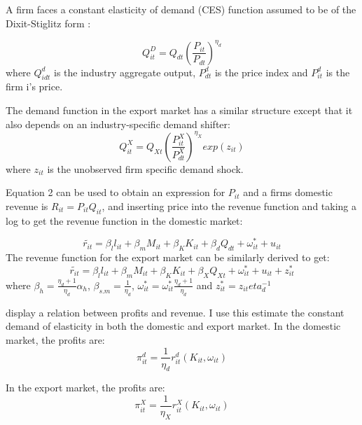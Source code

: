 \documentclass[11pt]{article}
\begin{document}
A firm faces a constant elasticity of demand (CES) function assumed to
be of the Dixit-Stiglitz form :

\begin{equation}
Q_{it}^{D} = Q_{dt}(\frac{P_{it}}{P_{dt}})^{\eta_{d}}
\end{equation} 
where $Q_{idt}^{d}$ is the industry aggregate output, $P_{dt}^{d}$ is
the price index and $P_{it}^{d}$ is the firm i's price. 

The demand function in the export market has a similar structure
except that it also depends on an industry-specific demand shifter: 
\begin{equation}
Q_{it}^{X} = Q_{Xt}(\frac{P_{it}^{X}}{P_{dt}^{X}})^{\eta_{X}}exp(z_{it})
\end{equation} 
where $z_{it}$ is the unobserved firm specific demand
shock. 

Equation 2 can be used to obtain an expression for $P_{it}$ and a
firms domestic revenue is $R_{it} = P_{it}Q_{it}$, and inserting price
into the revenue function and taking a log to get the revenue function
in the domestic market:

\begin{equation}
\tilde{r_{it}} = \beta_{l}l_{it} + \beta_{m}M_{it} + \beta_{K}K_{it} +
\beta_{d}Q_{dt} + \omega^{*}_{it} + u_{it}
\end{equation}
 The revenue function for the export market can be similarly derived
 to get:
\begin{equation}
\tilde{r_{it}} = \beta_{l}l_{it} + \beta_{m}M_{it} + \beta_{K}K_{it} +
\beta_{X}Q_{Xt} + \omega^{*}_{it} + u_{it} + z^{*}_{it}
\end{equation}
where $\beta_{h}= \frac{\eta_{d}+1}{\eta_{d}}\alpha_{h}$, $\beta_{s.m} =
\frac{1}{\eta_{d}}$, $\omega^{*}_{it} =
\omega^{*}_{it}\frac{\eta_{d}+1}{\eta_{d}}$ and $z^{*}_{it} =
z_{it} eta_{d}^{-1}$


\cite{das2007market} display a relation between profits and revenue. I
use this estimate the constant demand of elasticity in both the
domestic and export market. 
In the domestic market, the profits are: 
\begin{equation}
\pi_{it}^d = \frac{1}{\eta_{d}} r_{it}^{d}(K_{it}, \omega_{it})
\end{equation} 

In the export market, the profits are: 
\begin{equation}
\pi_{it}^X = \frac{1}{\eta_{X}} r_{it}^{X}(K_{it}, \omega_{it})
\end{equation} 
\end{document}
